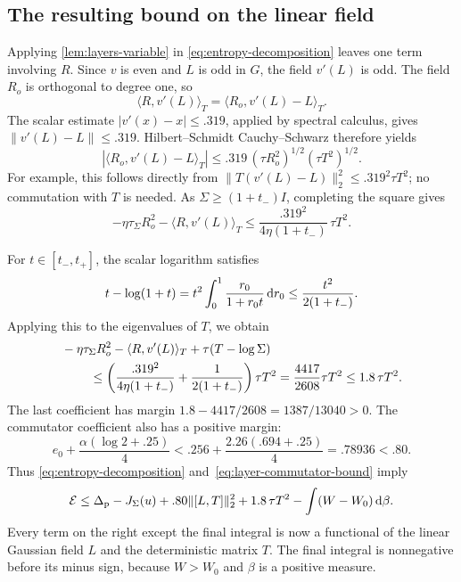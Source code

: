 \subsection{The resulting bound on the linear field}

Applying \cref{lem:layers-variable} in \eqref{eq:entropy-decomposition} leaves one term involving $R$. Since $v$ is even and $L$ is odd in $G$, the field $v'(L)$ is odd.  The field $R_o$ is orthogonal to degree one, so
\[
 \langle R,v'(L)\rangle_T
 =\langle R_o,v'(L)-L\rangle_T.
\]
The scalar estimate $|v'(x)-x|\le.319$, applied by spectral calculus, gives $\|v'(L)-L\|\le.319$. Hilbert--Schmidt Cauchy--Schwarz therefore yields
\[
 |\langle R_o,v'(L)-L\rangle_T|
 \le .319\,(\tau R_o^2)^{1/2}(\tau T^2)^{1/2}.
\]
For example, this follows directly from $\|T(v'(L)-L)\|_2^2\le .319^2\tau T^2$; no commutation with $T$ is needed. As $\Sigma\ge(1+t_-)I$, completing the square gives
\[
 -\eta\tau_\Sigma R_o^2-\langle R,v'(L)\rangle_T
 \le\frac{.319^2}{4\eta(1+t_-)}\,\tau T^2.
\]

For $t\in[t_-,t_+]$, the scalar logarithm satisfies
\[
 t-\log(1+t)
 =t^2\int_0^1\frac{r_0}{1+r_0t}\,\mathrm{d} r_0
 \le\frac{t^2}{2(1+t_-)}.
\]
Applying this to the eigenvalues of $T$, we obtain
\[
 \begin{aligned}
 &-\eta\tau_\Sigma R_o^2-\langle R,v'(L)\rangle_T
                +\tau(T-\log\Sigma)\\
 &\hspace{8mm}\le
 \left(\frac{.319^2}{4\eta(1+t_-)}
                   +\frac1{2(1+t_-)}\right)\tau T^2
 =\frac{4417}{2608}\tau T^2
 \le1.8\,\tau T^2.
 \end{aligned}
\]
The last coefficient has margin $1.8-4417/2608=1387/13040>0$. The commutator coefficient also has a positive margin:
\[
 e_0+\frac{\alpha(\log2+.25)}4
 <.256+\frac{2.26(.694+.25)}4
 =.78936<.80.
\]
Thus \eqref{eq:entropy-decomposition} and~\eqref{eq:layer-commutator-bound} imply
\begin{equation}
 \mathcal{E}\le
 \Delta_{\rm p}-J_\Sigma(u)+.80\|[L,T]\|_2^2
       +1.8\,\tau T^2-\int(W-W_0)\,\mathrm{d} \beta.
 \label{eq:entropy-upper-bound}
\end{equation}
Every term on the right except the final integral is now a functional of the linear Gaussian field $L$ and the deterministic matrix $T$.  The final integral is nonnegative before its minus sign, because $W>W_0$ and $\beta$ is a positive measure.
